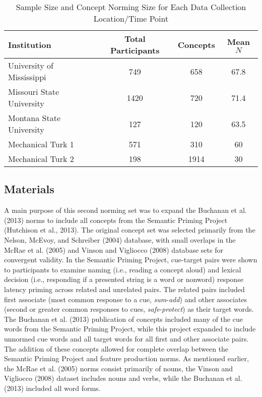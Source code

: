 \documentclass[english,,man]{apa6}
\theoremstyle{definition}
\theoremstyle{definition}
\theoremstyle{definition}
\theoremstyle{remark}
\begin{document}
\begin{table}[tbp]
\begin{center}
\begin{threeparttable}
\caption{\label{tab:part-table}Sample Size and Concept Norming Size for Each Data Collection Location/Time Point}
\begin{tabular}{lccc}
\toprule
Institution & Total Participants & Concepts & Mean $N$\\
\midrule
University of Mississippi & 749 & 658 & 67.8\\
Missouri State University & 1420 & 720 & 71.4\\
Montana State University & 127 & 120 & 63.5\\
Mechanical Turk 1 & 571 & 310 & 60\\
Mechanical Turk 2 & 198 & 1914 & 30\\
\bottomrule
\end{tabular}
\end{threeparttable}
\end{center}
\end{table}

\hypertarget{materials}{%
\subsection{Materials}\label{materials}}

A main purpose of this second norming set was to expand the Buchanan et
al. (2013) norms to include all concepts from the Semantic Priming
Project (Hutchison et al., 2013). The original concept set was selected
primarily from the Nelson, McEvoy, and Schreiber (2004) database, with
small overlaps in the McRae et al. (2005) and Vinson and Vigliocco
(2008) database sets for convergent validity. In the Semantic Priming
Project, cue-target pairs were shown to participants to examine naming
(i.e., reading a concept aloud) and lexical decision (i.e., responding
if a presented string is a word or nonword) response latency priming
across related and unrelated pairs. The related pairs included first
associate (most common response to a cue, \emph{sum}-\emph{add}) and
other associates (second or greater common responses to cues,
\emph{safe}-\emph{protect}) as their target words. The Buchanan et al.
(2013) publication of concepts included many of the cue words from the
Semantic Priming Project, while this project expanded to include
unnormed cue words and all target words for all first and other
associate pairs. The addition of these concepts allowed for complete
overlap between the Semantic Priming Project and feature production
norms. As mentioned earlier, the McRae et al. (2005) norms consist
primarily of nouns, the Vinson and Vigliocco (2008) dataset includes
nouns and verbs, while the Buchanan et al. (2013) included all word
forms.
\end{document}
